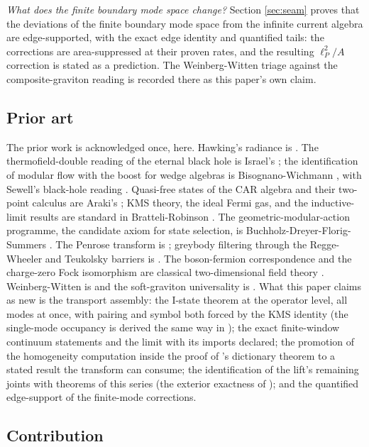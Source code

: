 \emph{What does the finite boundary mode space change?} Section \ref{sec:seam} proves that the deviations of the finite boundary mode space from the infinite current algebra are edge-supported, with the exact edge identity and quantified tails: the corrections are area-suppressed at their proven rates, and the resulting $\ell_P^2/A$ correction is stated as a prediction. The Weinberg-Witten triage against the composite-graviton reading is recorded there as this paper's own claim.

\subsection*{Prior art}

The prior work is acknowledged once, here. Hawking's radiance is \cite{Hawking1975}. The thermofield-double reading of the eternal black hole is Israel's \cite{Israel1976}; the identification of modular flow with the boost for wedge algebras is Bisognano-Wichmann \cite{BisognanoWichmann1976}, with Sewell's black-hole reading \cite{Sewell1982}. Quasi-free states of the CAR algebra and their two-point calculus are Araki's \cite{Araki1971}; KMS theory, the ideal Fermi gas, and the inductive-limit results are standard in Bratteli-Robinson \cite{BratteliRobinson1997}. The geometric-modular-action programme, the candidate axiom for state selection, is Buchholz-Dreyer-Florig-Summers \cite{BDFS2000}. The Penrose transform is \cite{Penrose1969, EPW1981}; greybody filtering through the Regge-Wheeler and Teukolsky barriers is \cite{ReggeWheeler1957, Teukolsky1973, Page1976}. The boson-fermion correspondence and the charge-zero Fock isomorphism are classical two-dimensional field theory \cite{FrenkelKac1980}. Weinberg-Witten is \cite{WeinbergWitten1980} and the soft-graviton universality is \cite{Weinberg1964}. What this paper claims as new is the transport assembly: the I-state theorem at the operator level, all modes at once, with pairing and symbol both forced by the KMS identity (the single-mode occupancy is derived the same way in \cite{ButlerT5}); the exact finite-window continuum statements and the limit with its imports declared; the promotion of the homogeneity computation inside the proof of \cite{ButlerT9}'s dictionary theorem to a stated result the transform can consume; the identification of the lift's remaining joints with theorems of this series (the exterior exactness of \cite{ButlerT6}); and the quantified edge-support of the finite-mode corrections.

\subsection*{Contribution}

